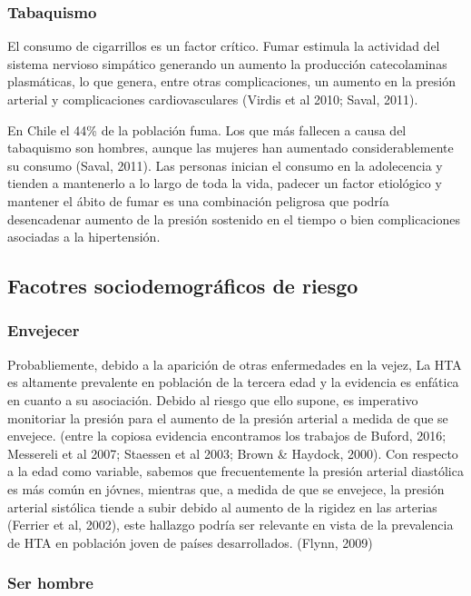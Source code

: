 \documentclass{aa}
\begin{document}
\subsubsection{Tabaquismo}

El consumo de cigarrillos es un factor crítico. Fumar estimula la actividad del sistema nervioso simpático generando un aumento la producción catecolaminas plasmáticas, lo que genera, entre otras complicaciones, un aumento en la presión arterial y complicaciones cardiovasculares (Virdis et al 2010; Saval, 2011).

En Chile el 44\% de la población fuma. Los que más fallecen a causa del tabaquismo son hombres, aunque las mujeres han aumentado considerablemente su consumo (Saval, 2011). Las personas inician el consumo en la adolecencia y tienden a mantenerlo a lo largo de toda la vida, padecer un factor etiológico y mantener el ábito de fumar es una combinación peligrosa que podría desencadenar aumento de la presión sostenido en el tiempo o bien complicaciones asociadas a la hipertensión.


\subsection{Facotres sociodemográficos de riesgo}

\subsubsection{Envejecer}

Probabliemente, debido a la aparición de otras enfermedades en la vejez, La HTA es altamente prevalente en población de la tercera edad y la evidencia es enfática en cuanto a su asociación. Debido al riesgo que ello supone, es imperativo monitoriar la presión para el aumento de la presión arterial a medida de que se envejece. (entre la copiosa evidencia encontramos los trabajos de Buford, 2016; Messereli et al 2007; Staessen et al 2003; Brown & Haydock, 2000).  Con respecto a la edad como variable, sabemos que frecuentemente la presión arterial diastólica es más común en jóvnes, mientras que, a medida de que se envejece, la presión arterial sistólica tiende a subir debido al aumento de la rigidez en las arterias (Ferrier et al, 2002), este hallazgo podría ser relevante en vista de la prevalencia de HTA en población joven de países desarrollados. (Flynn, 2009)

\subsubsection{Ser hombre}
\end{document}
